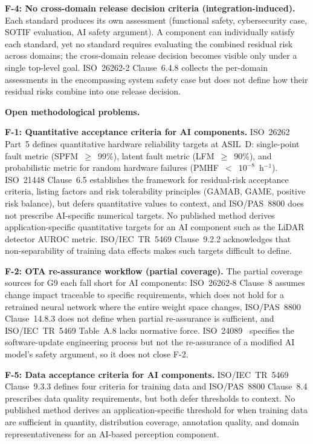 \documentclass[runningheads]{llncs}
\newcommand{\new}[1]{#1}
\newcommand{\new}[1]{\textcolor{blue}{#1}}
\newcommand{\crev}[1]{\textcolor{blue!75!black}{#1}}
\newcommand{\crev}[1]{#1}
\begin{document}
	\textbf{F-4: No cross-domain release decision criteria (integration-induced).} Each standard produces its own assessment (functional safety, cybersecurity case, SOTIF evaluation, AI safety argument). A component can individually satisfy each standard, yet no standard requires evaluating the combined residual risk across domains\new{; the cross-domain release decision becomes visible only under a single top-level goal}. \crev{ISO~26262-2 Clause~6.4.8 collects the per-domain assessments in the encompassing system safety case but does not define how their residual risks combine into one release decision.}
	
	\new{\textbf{Open methodological problems.}}
	
	\textbf{F-1: \new{Quantitative acceptance criteria for AI components}.} ISO~26262 Part~5 defines quantitative hardware reliability targets at ASIL~D: single-point fault metric (SPFM~$\geq$~99\%), latent fault metric (LFM~$\geq$~90\%), and probabilistic metric for random hardware failures (PMHF~$<$~$10^{-8}$~h$^{-1}$). \new{ISO~21448 Clause~6.5 establishes the framework for residual-risk acceptance criteria, listing factors and risk tolerability principles (GAMAB, GAME, positive risk balance), but defers quantitative values to context, and ISO/PAS~8800 does not prescribe AI-specific numerical targets. No published method derives application-specific quantitative targets for an AI component such as the LiDAR detector AUROC metric.} ISO/IEC~TR~5469 Clause~9.2.2 acknowledges that non-separability of training data effects makes such targets difficult to define.
	
	{\sloppy \textbf{F-2: \new{OTA re-assurance workflow (partial coverage)}.} The partial coverage sources for G9 each fall short for AI components: ISO~26262-8 Clause~8 assumes change impact traceable to specific requirements, which does not hold for a retrained neural network where the entire weight space changes, ISO/PAS~8800 Clause~14.8.3 does not define when partial re-assurance is sufficient, and ISO/IEC~TR~5469 Table~A.8 lacks normative force. \crev{ISO~24089~\cite{ISO24089} specifies the software-update engineering process but not the re-assurance of a modified AI model's safety argument, so it does not close F-2.}\par}
	
	\textbf{F-5: \new{Data acceptance criteria for AI components}.} ISO/IEC~TR~5469 Clause~9.3.3 defines four criteria for training data and \new{ISO/PAS~8800 Clause~8.4 prescribes data quality requirements, but both defer thresholds to context. No published method derives an application-specific threshold for when training data are sufficient in quantity, distribution coverage, annotation quality, and domain representativeness for an AI-based perception component.}
	
\end{document}
